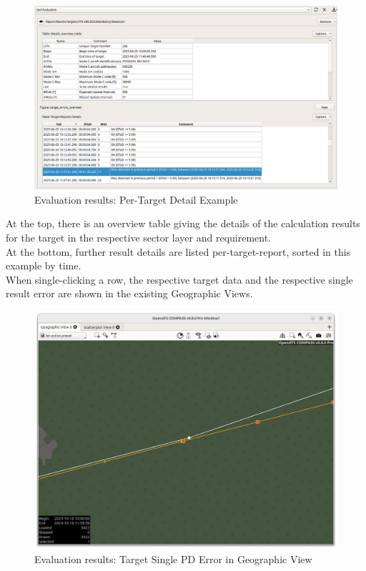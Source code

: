 \begin{figure}[H]
  \hspace*{-2cm}
    \includegraphics[width=18cm,frame]{figures/eval_results_target_example.png}
  \caption{Evaluation results: Per-Target Detail Example}
\end{figure}

At the top, there is an overview table giving the details of the calculation results for the target in the respective sector layer and requirement. \\

At the bottom, further result details are listed per-target-report, sorted in this example by time. \\

When single-clicking a row, the respective target data and the respective single result error are shown in the existing Geographic Views.

\begin{figure}[H]
  \hspace*{-2.5cm}
    \includegraphics[width=19cm]{figures/eval_results_pd_single_tr_geoview.png}
  \caption{Evaluation results: Target Single PD Error in Geographic View}
\end{figure}
